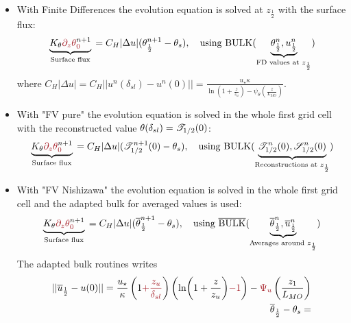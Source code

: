 \begin{itemize}
	\item With Finite Differences the evolution equation is
		solved at $z_{\frac{1}{2}}$ with the surface flux:
		\begin{equation}
			\underbrace{K_\theta
			\emphase{\partial_z \theta}^{n+1}_\emphase{0}}_{\text{
				Surface flux
			}} =
			C_H|\Delta u|(
			\theta_{\frac{1}{2}}^{n+1} - \theta_s),
			~~~ \text{using } {\rm BULK}
			(\underbrace{\theta_{\frac{1}{2}}^{n},
			u_{\frac{1}{2}}^{n}}_{
				\text{FD values at } z_{\frac{1}{2}}
			})
		\end{equation}
		where 
$C_H|\Delta u| = C_H||u^n(\delta_{sl})- u^n(0)|| = 
\frac{u_\star \kappa}{\ln\left(1+\frac{z}{z_{u}}\right)
    - \psi_\theta\left(\frac{z}{L_{MO}}\right) }$.

	\item With "FV pure" the evolution equation is solved in 
		the whole first grid cell with the reconstructed
		value $\theta(\delta_{sl}) = {\cal T}_{1/2}(0)$:
		\begin{equation}
			\underbrace{K_\theta
			\emphase{\partial_z \theta}^{n+1}_\emphase{0}}_{\text{
				Surface flux
			}} =
			C_H|\Delta u|({\cal T}_{1/2}^{n+1}(0)
			- \theta_s),
			~~~ \text{using } {\rm BULK}
			(\underbrace{{\cal T}_{1/2}^{n}(0),
			{\cal S}_{1/2}^{n}(0)}_{
			\text{Reconstructions at } z_{\frac{1}{2}}
			})
		\end{equation}
	\item With "FV Nishizawa" the evolution equation is solved in
		the whole first grid cell and the adapted bulk
		for averaged values is used:
		\begin{equation}
			\underbrace{K_\theta
			\emphase{\partial_z \theta}^{n+1}_\emphase{0}}_{\text{
				Surface flux
			}} =
			C_H|\Delta u| (
			\overline{\theta}_{\frac{1}{2}}^{n+1}
			- \theta_s),
			~~~ \text{using } \overline{\rm BULK}
			(\underbrace{\overline{\theta}_{\frac{1}{2}}^{n},
			\overline{u}_{\frac{1}{2}}^{n}}_{
			\text{Averages around } z_\frac{1}{2}})
		\end{equation}
		The adapted bulk routines writes
		\begin{equation}
		\label{eq:ND_StratifiedCase_MOST}
		\begin{aligned}
			 ||\overline{u}_{\frac{1}{2}}-u(0)||
			 = \frac{u_\star}{\kappa}
			\left(1\emphase{+\frac{z_u}{\delta_{sl}}}\right)
		\left(\ln(1+\frac{z}{z_u})\emphase{-1}\right)
		- \emphase{\Psi_u}\left(\frac{z_1}{L_{MO}}\right)
		    \\
			\overline{\theta}_{\frac{1}{2}} - \theta_s=

\end{aligned}
\end{equation}
\end{itemize}
